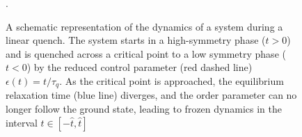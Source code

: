 \begin{figure}
    \centering
    \caption[Schematic representation of the dynamics of a system during a
        linear quench]
    {A schematic representation of the dynamics of a system during a
        linear quench. The system starts in a high-symmetry phase (\( t > 0 \)) and
        is quenched across a critical point to a low symmetry phase (\( t < 0 \)) by
        the reduced control parameter (red dashed line) \( \epsilon(t) = t/\tau_q \).
        As the critical point is approached, the equilibrium relaxation time
        (blue line) diverges, and the order parameter can no longer follow the
        ground state, leading to frozen dynamics in the interval
        \( t \in [-\hat{t}, \hat{t}] \)}.\label{fig: adiabatic-impulse}
\end{figure}

